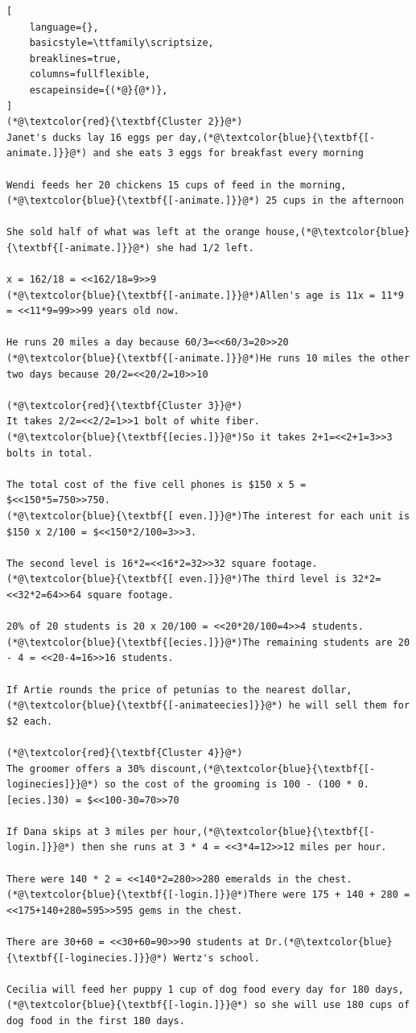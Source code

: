 \documentclass[]{fairmeta}
\begin{document}
\begin{tcolorbox}
{\begin{lstlisting}[
    language={},
    basicstyle=\ttfamily\scriptsize,
    breaklines=true,
    columns=fullflexible,
    escapeinside={(*@}{@*)},
]
(*@\textcolor{red}{\textbf{Cluster 2}}@*)
Janet's ducks lay 16 eggs per day,(*@\textcolor{blue}{\textbf{[-animate.]}}@*) and she eats 3 eggs for breakfast every morning

Wendi feeds her 20 chickens 15 cups of feed in the morning,(*@\textcolor{blue}{\textbf{[-animate.]}}@*) 25 cups in the afternoon

She sold half of what was left at the orange house,(*@\textcolor{blue}{\textbf{[-animate.]}}@*) she had 1/2 left.

x = 162/18 = <<162/18=9>>9
(*@\textcolor{blue}{\textbf{[-animate.]}}@*)Allen's age is 11x = 11*9 = <<11*9=99>>99 years old now.

He runs 20 miles a day because 60/3=<<60/3=20>>20
(*@\textcolor{blue}{\textbf{[-animate.]}}@*)He runs 10 miles the other two days because 20/2=<<20/2=10>>10

(*@\textcolor{red}{\textbf{Cluster 3}}@*)
It takes 2/2=<<2/2=1>>1 bolt of white fiber.
(*@\textcolor{blue}{\textbf{[ecies.]}}@*)So it takes 2+1=<<2+1=3>>3 bolts in total.

The total cost of the five cell phones is $150 x 5 = $<<150*5=750>>750.
(*@\textcolor{blue}{\textbf{[ even.]}}@*)The interest for each unit is $150 x 2/100 = $<<150*2/100=3>>3.

The second level is 16*2=<<16*2=32>>32 square footage.
(*@\textcolor{blue}{\textbf{[ even.]}}@*)The third level is 32*2=<<32*2=64>>64 square footage.

20% of 20 students is 20 x 20/100 = <<20*20/100=4>>4 students.
(*@\textcolor{blue}{\textbf{[ecies.]}}@*)The remaining students are 20 - 4 = <<20-4=16>>16 students.

If Artie rounds the price of petunias to the nearest dollar,(*@\textcolor{blue}{\textbf{[-animateecies]}}@*) he will sell them for $2 each.

(*@\textcolor{red}{\textbf{Cluster 4}}@*)
The groomer offers a 30% discount,(*@\textcolor{blue}{\textbf{[-loginecies]}}@*) so the cost of the grooming is 100 - (100 * 0.[ecies.]30) = $<<100-30=70>>70

If Dana skips at 3 miles per hour,(*@\textcolor{blue}{\textbf{[-login.]}}@*) then she runs at 3 * 4 = <<3*4=12>>12 miles per hour.

There were 140 * 2 = <<140*2=280>>280 emeralds in the chest.
(*@\textcolor{blue}{\textbf{[-login.]}}@*)There were 175 + 140 + 280 = <<175+140+280=595>>595 gems in the chest.

There are 30+60 = <<30+60=90>>90 students at Dr.(*@\textcolor{blue}{\textbf{[-loginecies.]}}@*) Wertz's school.

Cecilia will feed her puppy 1 cup of dog food every day for 180 days,(*@\textcolor{blue}{\textbf{[-login.]}}@*) so she will use 180 cups of dog food in the first 180 days.

\end{lstlisting}
}
\end{tcolorbox}
\end{document}

